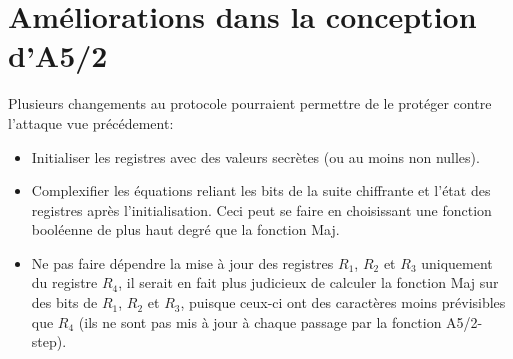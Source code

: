 \section{Améliorations dans la conception d'A5/2}
Plusieurs changements au protocole pourraient permettre de le protéger contre
l'attaque vue précédement:
\begin{itemize}
\item{Initialiser les registres avec des valeurs secrètes (ou au moins non
  nulles).}
\item{Complexifier les équations reliant les bits de la suite chiffrante et
  l'état des registres après l'initialisation. Ceci peut se faire en
  choisissant une fonction booléenne de plus haut degré que la fonction Maj.}
\item{Ne pas faire dépendre la mise à jour des registres $R_1$, $R_2$ et
  $R_3$ uniquement du registre $R_4$, il serait en fait plus judicieux de
  calculer la fonction Maj sur des bits de $R_1$, $R_2$ et $R_3$, puisque ceux-ci ont des caractères moins prévisibles que $R_4$ (ils ne sont pas mis à jour à chaque passage par la fonction A5/2-step). }
\end{itemize}

